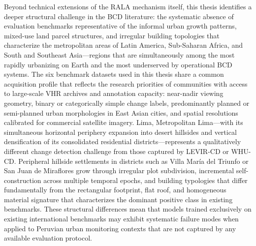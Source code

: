 Beyond technical extensions of the RALA mechanism itself, this thesis identifies
a deeper structural challenge in the BCD literature: the systematic absence of
evaluation benchmarks representative of the informal urban growth patterns,
mixed-use land parcel structures, and irregular building topologies that
characterize the metropolitan areas of Latin America, Sub-Saharan Africa, and
South and Southeast Asia---regions that are simultaneously among the most
rapidly urbanizing on Earth and the most underserved by operational BCD systems. The six benchmark datasets used in this thesis share a common acquisition profile
that reflects the research priorities of communities with access to large-scale
VHR archives and annotation capacity: near-nadir viewing geometry, binary or
categorically simple change labels, predominantly planned or semi-planned urban
morphologies in East Asian cities, and spatial resolutions calibrated for
commercial satellite imagery. Lima, Metropolitan Lima---with its simultaneous
horizontal periphery expansion into desert hillsides and vertical densification
of its consolidated residential districts---represents a qualitatively different
change detection challenge from those captured by LEVIR-CD or WHU-CD. Peripheral
hillside settlements in districts such as Villa María del Triunfo or San Juan de
Miraflores grow through irregular plot subdivision, incremental self-construction
across multiple temporal epochs, and building typologies that differ
fundamentally from the rectangular footprint, flat roof, and homogeneous material
signature that characterizes the dominant positive class in existing benchmarks.
These structural differences mean that models trained exclusively on existing
international benchmarks may exhibit systematic failure modes when applied to
Peruvian urban monitoring contexts that are not captured by any available
evaluation protocol.

